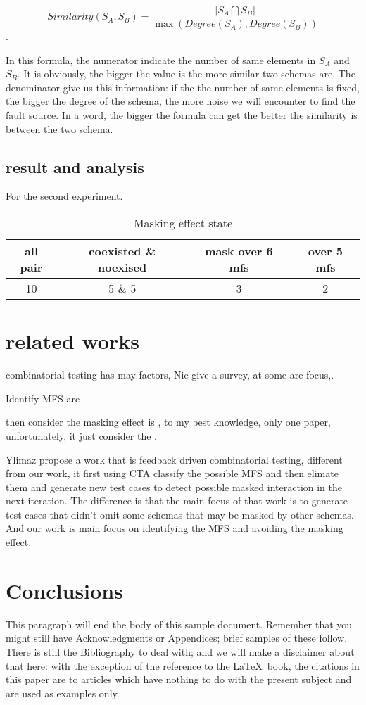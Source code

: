 \documentclass{sig-alternate}
\begin{document}
\begin{displaymath} Similarity(S_{A},S_{B})= \frac{|S_{A} \bigcap S_{B}|}{\max (Degree(S_{A}),Degree(S_{B})) } \end{displaymath}.

In this formula, the numerator indicate the number of same elements in  $S_{A}$ and $S_{B}$. It is obviously, the bigger the value is the more similar two schemas are.  The denominator give us this information: if the the number of same elements is fixed, the bigger the degree of the schema, the more noise we will encounter to find the fault source. In a word, the bigger the formula can get the better the similarity is between the two schema.

\subsection{result and analysis}

For the second experiment.

\begin{table}
\centering
\caption{Masking effect state}
\label{mask-evluate}
\begin{tabular}{|c|c|c|c| } \hline
all pair & coexisted \& noexised & mask over 6 mfs & over 5 mfs \\ \hline
10 & 5 \& 5 & 3 & 2 \\
\hline\end{tabular}
\end{table}


\section{related works}
combinatorial testing has may factors, Nie give a survey, at some are focus,.

Identify MFS are

then consider the masking effect is , to my best knowledge, only one paper, unfortunately, it just consider the .

Ylimaz propose a work that is feedback driven combinatorial testing, different from our work, it first using CTA classify the possible MFS and then elimate them and generate new test cases to detect possible masked interaction in the next iteration. The difference is that the main focus of that work is to generate test cases that didn't omit some schemas that may be masked by other schemas. And our work is main focus on identifying the MFS and avoiding the masking effect.

\section{Conclusions}
This paragraph will end the body of this sample document.
Remember that you might still have Acknowledgments or
Appendices; brief samples of these
follow.  There is still the Bibliography to deal with; and
we will make a disclaimer about that here: with the exception
of the reference to the \LaTeX\ book, the citations in
this paper are to articles which have nothing to
do with the present subject and are used as
examples only.
\end{document}
